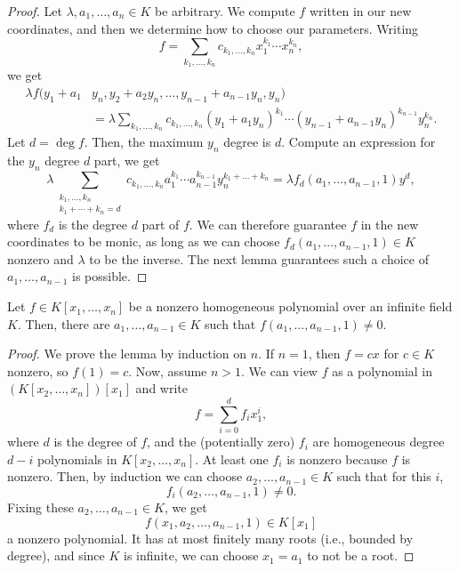 \documentclass[12pt]{article}
\begin{document}
\begin{proof}
    Let $\lambda, a_1,\dots,a_n \in K$ be arbitrary. We compute $f$ written in our new coordinates, and then we determine how to choose our parameters. Writing
    \[f = \sum_{k_1,\dots,k_n} c_{k_1,\dots,k_n} x_1^{k_1}\cdots x_n^{k_n},\]
    we get
    \begin{align*}
        \lambda f(y_1+a_1 &y_n, y_2 + a_2 y_n, \dots, y_{n-1} + a_{n-1}y_n, y_n)\\
        &= \lambda \sum_{k_1,\dots,k_n} c_{k_1,\dots,k_n} (y_1+a_1y_n)^{k_1}\cdots (y_{n-1}+a_{n-1}y_n)^{k_{n-1}} y_n^{k_n}.
    \end{align*}
    Let $d=\deg f$. Then, the maximum $y_n$ degree is $d$. Compute an expression for the $y_n$ degree $d$ part, we get
    \[
        \lambda \sum_{\substack{k_1,\dots,k_n\\ k_1+\cdots+k_n=d}} c_{k_1,\dots,k_n} a_1^{k_1}\cdots a_{n-1}^{k_{n-1}} y_n^{k_1+\dots+k_n} = \lambda f_d(a_1,\dots,a_{n-1},1) y^d,
    \]
    where $f_d$ is the degree $d$ part of $f$. We can therefore guarantee $f$ in the new coordinates to be monic, as long as we can choose $f_d(a_1,\dots,a_{n-1},1) \in K$ nonzero and $\lambda$ to be the inverse. The next lemma guarantees such a choice of $a_1,\dots,a_{n-1}$ is possible.
\end{proof}

\begin{lem}
    Let $f\in K[x_1,\dots,x_n]$ be a nonzero homogeneous polynomial over an infinite field $K$. Then, there are $a_1,\dots,a_{n-1}\in K$ such that $f(a_1,\dots,a_{n-1},1)\neq 0$.
\end{lem}

\begin{proof}
    We prove the lemma by induction on $n$. If $n=1$, then $f=cx$ for $c\in K$ nonzero, so $f(1)=c$. Now, assume $n>1$. We can view $f$ as a polynomial in $(K[x_2,\dots,x_n])[x_1]$ and write
    \[f=\sum_{i=0}^d f_i x_1^i,\]
    where $d$ is the degree of $f$, and the (potentially zero) $f_i$ are homogeneous degree $d-i$ polynomials in $K[x_2,\dots,x_n]$. At least one $f_i$ is nonzero because $f$ is nonzero. Then, by induction we can choose $a_2,\dots,a_{n-1}\in K$ such that for this $i$,
    \[f_i(a_2,\dots,a_{n-1},1)\neq 0.\]
    Fixing these $a_2,\dots,a_{n-1}\in K$, we get
    \[f(x_1,a_2,\dots,a_{n-1},1) \in K[x_1]\]
    a nonzero polynomial. It has at most finitely many roots (i.e., bounded by degree), and since $K$ is infinite, we can choose $x_1=a_1$ to not be a root.
\end{proof}
\end{document}
